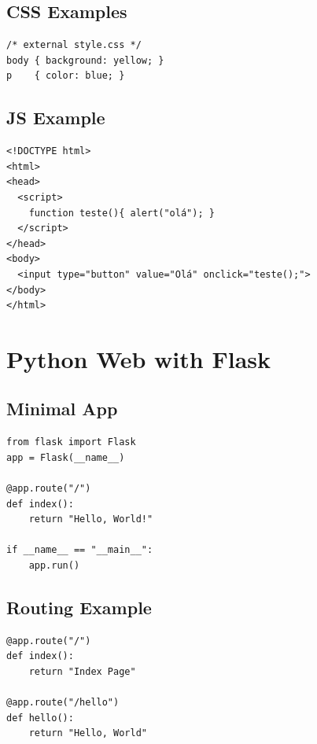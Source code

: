 \subsection*{CSS Examples}
\begin{lstlisting}
/* external style.css */
body { background: yellow; }
p    { color: blue; }
\end{lstlisting}

\subsection*{JS Example}
\begin{lstlisting}
<!DOCTYPE html>
<html>
<head>
  <script>
    function teste(){ alert("olá"); }
  </script>
</head>
<body>
  <input type="button" value="Olá" onclick="teste();">
</body>
</html>
\end{lstlisting}

\section{Python Web with Flask}


\subsection*{Minimal App}
\begin{lstlisting}
from flask import Flask
app = Flask(__name__)

@app.route("/")
def index():
    return "Hello, World!"

if __name__ == "__main__":
    app.run()
\end{lstlisting}

\subsection*{Routing Example}
\begin{lstlisting}
@app.route("/")
def index():
    return "Index Page"

@app.route("/hello")
def hello():
    return "Hello, World"
\end{lstlisting}

